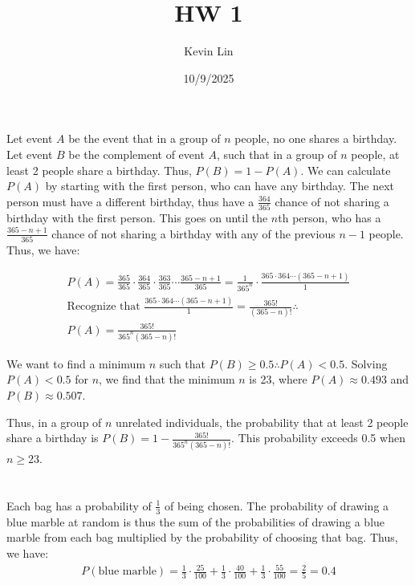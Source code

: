 \documentclass[11pt,a4paper,margin=1in]{article}
\title{HW 1}
\author{Kevin Lin}
\date{10/9/2025}
\begin{document}
\maketitle
\section{}
    Let event $A$ be the event that in a group of $n$ people, no one shares a birthday.
    Let event $B$ be the complement of event $A$, such that in a group of $n$ people,
    at least 2 people share a birthday. Thus, $P(B) = 1 - P(A)$. We can calculate
    $P(A)$ by starting with the first person, who can have any birthday. The next
    person must have a different birthday, thus have a $\frac{364}{365}$ chance of
    not sharing a birthday with the first person. This goes on until the $n$th person,
    who has a $\frac{365 - n + 1}{365}$ chance of not sharing a birthday with any
    of the previous $n - 1$ people. Thus, we have:
    
    \begin{gather*}
        P(A) = \frac{365}{365} \cdot \frac{364}{365} \cdot \frac{363}{365} \cdots \frac{365 - n + 1}{365} = \frac{1}{365^n} \cdot \frac{365 \cdot 364 \cdots (365 - n + 1)}{1}\\
        \text{Recognize that } \frac{365 \cdot 364 \cdots (365 - n + 1)}{1} = \frac{365!}{(365 - n)!} \therefore\\
        P(A) = \frac{365!}{365^n (365 - n)!}
    \end{gather*}

    \noindent We want to find a minimum $n$ such that $P(B) \geq 0.5 \therefore P(A) < 0.5$.
    Solving $P(A) < 0.5$ for $n$, we find that the minimum $n$ is 23, where $P(A) \approx 0.493$
    and $P(B) \approx 0.507$.

    \vspace{10pt}

    \noindent Thus, in a group of $n$ unrelated individuals, the probability that at least
    2 people share a birthday is $P(B) = 1 - \frac{365!}{365^n (365 - n)!}$.
    This probability exceeds 0.5 when $n \geq 23$.

\section{}
    \subsection{}
        Each bag has a probability of $\frac{1}{3}$ of being chosen. The probability
        of drawing a blue marble at random is thus the sum of the probabilities
        of drawing a blue marble from each bag multiplied by the probability of
        choosing that bag. Thus, we have:
        \begin{gather*}
            P(\text{blue marble}) = \frac{1}{3} \cdot \frac{25}{100} + \frac{1}{3} \cdot \frac{40}{100} + \frac{1}{3} \cdot \frac{55}{100} = \frac{2}{5} = 0.4
        \end{gather*} 
\end{document}
